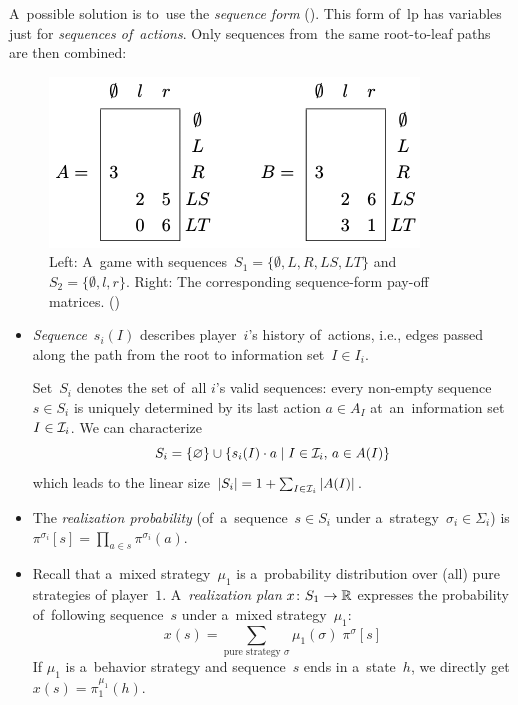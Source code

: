 A~possible solution is to~use the \emph{sequence form} (\cite[pp.~70--73]{AGT07}).
This form of~\acrshort{lp} has variables just for \emph{sequences of~actions}.
Only sequences from~the same root-to-leaf paths are then combined:
\begin{figure}[H]
  \centering
  \tiny
  \def\svgwidth{.5\textwidth}
  
  \includegraphics[width=.4\textwidth]{../img/sequence-form.png}
  \caption[The sequence-form pay-off matrices]{Left: A~game with sequences~$S_1 = \{\emptyset, L, R, LS, LT\}$ and $S_2 = \{\emptyset, l, r \}$.
    Right: The corresponding sequence-form pay-off matrices. (\cite[p.~67]{AGT07})}
  \label{fig:sequence-form}
\end{figure}
\noindent
\begin{itemize}
  \item \emph{Sequence}~$s_i(I)$ describes player~$i$'s history of~actions, i.e., edges passed along the path from the root to information set~$I\in I_i$.

    Set~$S_i$ denotes the set of~all $i$'s valid sequences:
    every non-empty sequence $s\in S_i$ is uniquely determined by its last action $a\in A_{I}$ at~an~information set~$I \in \mathcal{I}_i$.
    We can characterize
    \[
      S_i = \{\varnothing\} \cup \{ s_i(I) \cdot a \mid I\in\mathcal{I}_i,\, a\in A(I) \}
    \]
    which leads to the linear size $\left\vert S_i \right\vert = 1 + \sum_{I\in\mathcal{I}_i} \left\vert A(I) \right\vert$.

  \item The \emph{realization probability} (of~a~sequence~$s \in S_i$ under a~strategy~$\sigma_i \in \Sigma_i$) is $\pi^{\sigma_i} [s] = \prod_{a \in s} \pi^{\sigma_i}(a)$.

  \item Recall that a~mixed strategy~$\mu_1$ is a~probability distribution over (all) pure strategies of player~$1$.
    A~\emph{realization plan}\footnotemark{} $x\colon S_1 \to \mathbb{R}$ expresses the probability of~following sequence~$s$ under a~mixed strategy~$\mu_1$:
    \[
      x(s) = \sum _{\textrm{pure strategy } \sigma} \mu_1(\sigma)\; \pi^{\sigma}[s]
    \]
    If $\mu_1$ is a~behavior strategy and sequence~$s$ ends in a~state~$h$, we directly get $x(s) = \pi^{\mu_1}_1(h)$.
\end{itemize}

